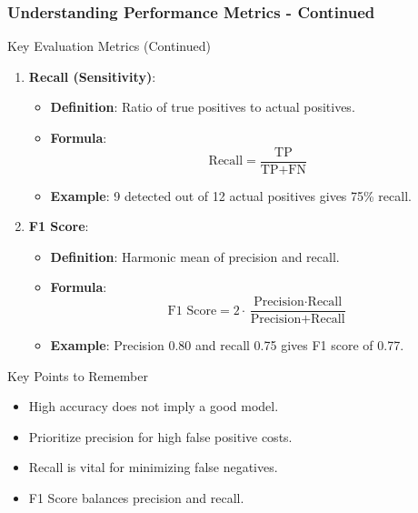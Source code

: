 \documentclass[aspectratio=169]{beamer}
\begin{document}
\begin{frame}[fragile]
    \frametitle{Understanding Performance Metrics - Continued}
    \begin{block}{Key Evaluation Metrics (Continued)}
        \begin{enumerate}[resume]
            \item \textbf{Recall (Sensitivity)}:
                \begin{itemize}
                    \item \textbf{Definition}: Ratio of true positives to actual positives.
                    \item \textbf{Formula}:
                        \begin{equation}
                        \text{Recall} = \frac{\text{TP}}{\text{TP} + \text{FN}}
                        \end{equation}
                    \item \textbf{Example}: 9 detected out of 12 actual positives gives 75\% recall.
                \end{itemize}
            \item \textbf{F1 Score}:
                \begin{itemize}
                    \item \textbf{Definition}: Harmonic mean of precision and recall.
                    \item \textbf{Formula}:
                        \begin{equation}
                        \text{F1 Score} = 2 \cdot \frac{\text{Precision} \cdot \text{Recall}}{\text{Precision} + \text{Recall}}
                        \end{equation}
                    \item \textbf{Example}: Precision 0.80 and recall 0.75 gives F1 score of 0.77.
                \end{itemize}
        \end{enumerate}
    \end{block}
    \begin{block}{Key Points to Remember}
        \begin{itemize}
            \item High accuracy does not imply a good model.
            \item Prioritize precision for high false positive costs.
            \item Recall is vital for minimizing false negatives.
            \item F1 Score balances precision and recall.
        \end{itemize}
    \end{block}
\end{frame}
\end{document}
